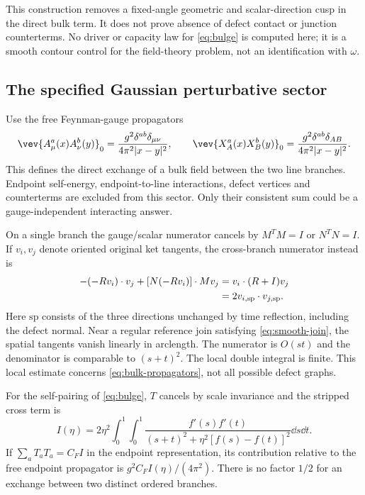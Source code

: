 This construction removes a fixed-angle geometric and scalar-direction
cusp in the direct bulk term. It does not prove absence of defect
contact or junction counterterms. No driver or capacity law for
\eqref{eq:bulge} is computed here; it is a smooth contour control for
the field-theory problem, not an identification with $\omega$.

\subsection{The specified Gaussian perturbative sector}

Use the free Feynman-gauge propagators
\begin{equation}\label{eq:bulk-propagators}
 \vev{A_\mu^a(x)A_\nu^b(y)}_0
 =\frac{g^2\delta^{ab}\delta_{\mu\nu}}{4\pi^2|x-y|^2},\qquad
 \vev{X_A^a(x)X_B^b(y)}_0
 =\frac{g^2\delta^{ab}\delta_{AB}}{4\pi^2|x-y|^2}.
\end{equation}
This defines the direct exchange of a bulk field between the two line
branches. Endpoint self-energy, endpoint-to-line interactions, defect
vertices and counterterms are excluded from this sector. Only their
consistent sum could be a gauge-independent interacting answer.

On a single branch the gauge/scalar numerator cancels by $M^TM=I$
or $N^TN=I$. If $v_i,v_j$ denote oriented original ket tangents,
the cross-branch numerator instead is
\begin{align}\label{eq:cross-numerator}
 -(-Rv_i)\cdot v_j+[N(-Rv_i)]\cdot Mv_j
 &=v_i\cdot(R+I)v_j\notag\\
 &=2v_{i,\mathrm{sp}}\cdot v_{j,\mathrm{sp}}.
\end{align}
Here $\mathrm{sp}$ consists of the three directions unchanged by time
reflection, including the defect normal. Near a regular reference
join satisfying \eqref{eq:smooth-join}, the spatial tangents vanish
linearly in arclength. The numerator is $O(st)$ and the denominator
is comparable to $(s+t)^2$. The local double integral is finite.
This local estimate concerns \eqref{eq:bulk-propagators}, not all
possible defect graphs.

For the self-pairing of \eqref{eq:bulge}, $T$ cancels by scale
invariance and the stripped cross term is
\begin{equation}\label{eq:bulk-I}
 I(\eta)=2\eta^2\int_0^1\!\int_0^1
 \frac{f'(s)f'(t)}{(s+t)^2+\eta^2[f(s)-f(t)]^2}\dd s\dd t.
\end{equation}
If $\sum_aT_aT_a=C_F I$ in the endpoint representation, its contribution
relative to the free endpoint propagator is
$g^2C_F I(\eta)/(4\pi^2)$. There is no factor $1/2$ for an exchange
between two distinct ordered branches.

